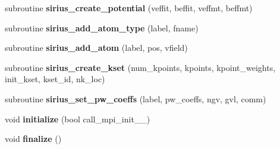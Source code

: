 \begin{DoxyCompactItemize}
\item 
\hypertarget{namespacesirius_aa01ec827b578992edf4ba8c33e0ad813}{}subroutine {\bfseries sirius\+\_\+create\+\_\+potential} (veffit, beffit, veffmt, beffmt)\label{namespacesirius_aa01ec827b578992edf4ba8c33e0ad813}

\item 
\hypertarget{namespacesirius_a6469b3a7b76bcf48277f68fe873757a4}{}subroutine {\bfseries sirius\+\_\+add\+\_\+atom\+\_\+type} (label, fname)\label{namespacesirius_a6469b3a7b76bcf48277f68fe873757a4}

\item 
\hypertarget{namespacesirius_afc46a55a9ffab1608d1c0b2acb30c5fe}{}subroutine {\bfseries sirius\+\_\+add\+\_\+atom} (label, pos, vfield)\label{namespacesirius_afc46a55a9ffab1608d1c0b2acb30c5fe}

\item 
\hypertarget{namespacesirius_a77e7ce9b3094cd3953d8c54655b24955}{}subroutine {\bfseries sirius\+\_\+create\+\_\+kset} (num\+\_\+kpoints, kpoints, kpoint\+\_\+weights, init\+\_\+kset, kset\+\_\+id, nk\+\_\+loc)\label{namespacesirius_a77e7ce9b3094cd3953d8c54655b24955}

\item 
\hypertarget{namespacesirius_a661bcae26acf0dcc78f27d3497b8fbf0}{}subroutine {\bfseries sirius\+\_\+set\+\_\+pw\+\_\+coeffs} (label, pw\+\_\+coeffs, ngv, gvl, comm)\label{namespacesirius_a661bcae26acf0dcc78f27d3497b8fbf0}

\item 
\hypertarget{namespacesirius_a5926de99ae1c956edf885c5228b64525}{}void {\bfseries initialize} (bool call\+\_\+mpi\+\_\+init\+\_\+\+\_\+)\label{namespacesirius_a5926de99ae1c956edf885c5228b64525}

\item 
\hypertarget{namespacesirius_a08079b8ff76ca1fb31c8922e7a6cf26a}{}void {\bfseries finalize} ()\label{namespacesirius_a08079b8ff76ca1fb31c8922e7a6cf26a}


\end{DoxyCompactItemize}
